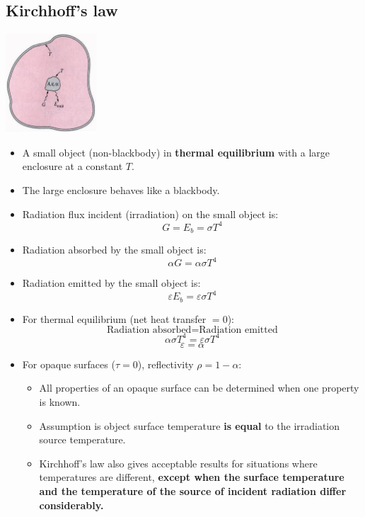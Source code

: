 \documentclass[11pt]{article}
\begin{document}
\subsection{Kirchhoff's law}
\label{sec:orgfbef24c}
\begin{center}
\includegraphics[height=10em]{./images/kirchhoffs-law-diagram.png}
\end{center}
\begin{itemize}
\item A small object (non-blackbody) in \textbf{thermal equilibrium} with a large enclosure at a constant \(T\).
\item The large enclosure behaves like a blackbody.
\item Radiation flux incident (irradiation) on the small object is:
\[G = E_b = \sigma T^4\]
\item Radiation absorbed by the small object is:
\[\alpha G = \alpha \sigma T^4\]
\item Radiation emitted by the small object is:
\[\varepsilon E_b = \varepsilon \sigma T^4\]
\item For thermal equilibrium (net heat transfer \(= 0\)):
\[\text{Radiation absorbed} = \text{Radiation emitted}\]
\[\alpha \sigma T^4 = \varepsilon \sigma T^4\]
\[\varepsilon = \alpha\]
\item For opaque surfaces (\(\tau = 0\)), reflectivity \(\rho = 1 - \alpha\):
\begin{itemize}
\item All properties of an opaque surface can be determined when one property is known.
\item Assumption is object surface temperature \textbf{is equal} to the irradiation source temperature.
\item Kirchhoff's law also gives acceptable results for situations where temperatures are different, \textbf{except when the surface temperature and the temperature of the source of incident radiation differ considerably.}
\end{itemize}
\end{itemize}
\end{document}
